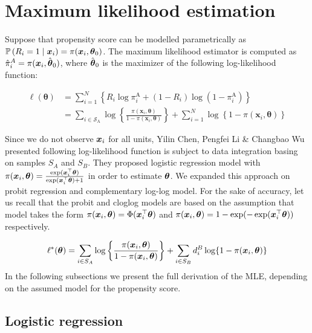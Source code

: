 \documentclass[
  letterpaper,
  DIV=11,
  numbers=noendperiod]{scrreprt}
\begin{document}
\hypertarget{maximum-likelihood-estimation}{%
\section{Maximum likelihood
estimation}\label{maximum-likelihood-estimation}}

Suppose that propensity score can be modelled parametrically as
\(\mathbb{P}\left(R_i=1 \mid \boldsymbol{x}_i\right) = \pi(\boldsymbol{x}_{i}, \boldsymbol{\theta}_{0})\).
The maximum likelihood estimator is computed as
\(\hat{\pi}_{i}^{A} = \pi(\boldsymbol{x}_{i}, \hat{\boldsymbol{\theta}}_{0})\), where
\(\hat{\boldsymbol{\theta}}_{0}\) is the maximizer of the following log-likelihood
function:

\[
    \begin{split}
 \ell(\boldsymbol{\theta}) & =\sum_{i=1}^N\left\{R_i \log \pi_i^{\mathrm{A}}+\left(1-R_i\right) \log \left(1-\pi_i^{\mathrm{A}}\right)\right\} \\ & =\sum_{i \in \mathcal{S}_{\mathrm{A}}} \log \left\{\frac{\pi\left(\boldsymbol{x}_i, \boldsymbol{\theta}\right)}{1-\pi\left(\boldsymbol{x}_i, \boldsymbol{\theta}\right)}\right\}+\sum_{i=1}^N \log \left\{1-\pi\left(\boldsymbol{x}_i, \boldsymbol{\theta}\right)\right\}
    \end{split}
\]

Since we do not observe \(\boldsymbol{x}_i\) for all units, Yilin Chen, Pengfei Li
\& Changbao Wu presented following log-likelihood function is subject to
data integration basing on samples \(S_A\) and \(S_B\). They proposed
logistic regression model with
\(\pi(\boldsymbol{x}_{i}, \boldsymbol{\theta}) = \frac{\exp(\boldsymbol{x}_{i}^{\top}\boldsymbol{\theta})}{\exp(\boldsymbol{x}_{i}^{\top}\boldsymbol{\theta}) + 1}\)
in order to estimate \(\boldsymbol{\theta}\). We expanded this approach on probit
regression and complementary log-log model. For the sake of accuracy,
let us recall that the probit and cloglog models are based on the
assumption that model takes the form
\(\pi(\boldsymbol{x}_{i},\boldsymbol{\theta}) = \Phi(\boldsymbol{x}_{i}^{\top}\boldsymbol{\theta})\) and
\(\pi(\boldsymbol{x}_{i}, \boldsymbol{\theta}) = 1 - \exp(-\exp(\boldsymbol{x}_{i}^{\top}\boldsymbol{\theta}))\)
respectively.

\[
    \ell^{*}(\boldsymbol{\theta}) = \sum_{i \in S_{A}}\log \left\{\frac{\pi(\boldsymbol{x}_{i}, \boldsymbol{\theta})}{1 - \pi(\boldsymbol{x}_{i},\boldsymbol{\theta})}\right\} + \sum_{i \in S_{B}}d_{i}^{B}\log\{1 - \pi({\boldsymbol{x}_{i},\boldsymbol{\theta}})\}
\] In the following subsections we present the full derivation of the
MLE, depending on the assumed model for the propensity score.

\hypertarget{logistic-regression}{%
\subsection{Logistic regression}\label{logistic-regression}}
\end{document}

